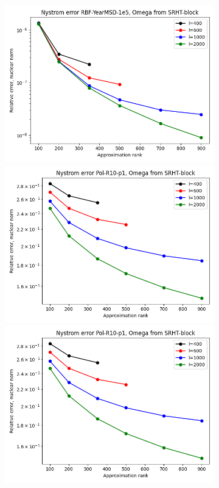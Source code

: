 \documentclass{article}
\theoremstyle{definition}
\begin{document}
\begin{figure}
\begin{subfigure}[t]{\textwidth+20pt\relax}
    \includegraphics[width=\dimexpr\linewidth-20pt\relax]{plots/relerror/relerror_RBF-YearMSD-1e5_SRHT-block.png}
    \includegraphics[width=\dimexpr\linewidth-20pt\relax]{plots/relerror/relerror_Pol-R10-p1_SRHT-block.png}
    \includegraphics[width=\dimexpr\linewidth-20pt\relax]{plots/relerror/relerror_Pol-R10-p1_SRHT-block.png}

\end{subfigure}
\end{figure}
\end{document}
